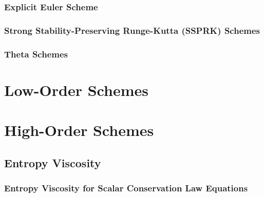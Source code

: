     \subsubsection{Explicit Euler Scheme}
      
    \subsubsection{Strong Stability-Preserving Runge-Kutta (SSPRK)
      Schemes\label{sec:ssprk}}
      
    \subsubsection{Theta Schemes\label{sec:theta}}
      
\section{Low-Order Schemes}  
%     
%     
%     
%     
%     
\section{High-Order Schemes}  
  \subsection{Entropy Viscosity}
    \subsubsection{Entropy Viscosity for Scalar Conservation Law Equations}
      
